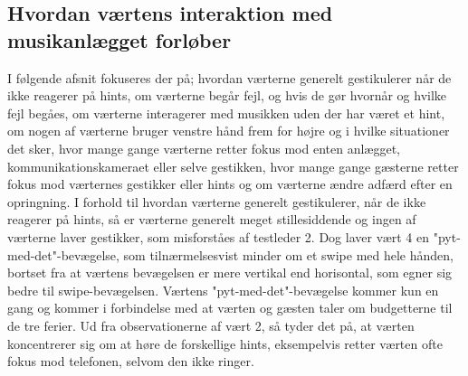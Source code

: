 \subsection{Hvordan værtens interaktion med musikanlægget forløber}
\label{TestresultaterSocialAcceptVaertsGestikker}
%
I følgende afsnit fokuseres der på; hvordan værterne generelt gestikulerer når de ikke reagerer på hints, om værterne begår fejl, og hvis de gør hvornår og hvilke fejl begåes, om værterne interagerer med musikken uden der har været et hint, om nogen af værterne bruger venstre hånd frem for højre og i hvilke situationer det sker, hvor mange gange værterne retter fokus mod enten anlægget, kommunikationskameraet eller selve gestikken, hvor mange gange gæsterne retter fokus mod værternes gestikker eller hints og om værterne ændre adfærd efter en opringning.\blankline
%
I forhold til hvordan værterne generelt gestikulerer, når de ikke reagerer på hints, så er værterne generelt meget stillesiddende og ingen af værterne laver gestikker, som misforståes af testleder 2. Dog laver vært 4 en "pyt-med-det"-bevægelse, som tilnærmelsesvist minder om et swipe med hele hånden, bortset fra at værtens bevægelsen er mere vertikal end horisontal, som egner sig bedre til swipe-bevægelsen. Værtens "pyt-med-det"-bevægelse kommer kun en gang og kommer i forbindelse med at værten og gæsten taler om budgetterne til de tre ferier. Ud fra observationerne af vært 2, så tyder det på, at værten koncentrerer sig om at høre de forskellige hints, eksempelvis retter værten ofte fokus mod telefonen, selvom den ikke ringer.  


